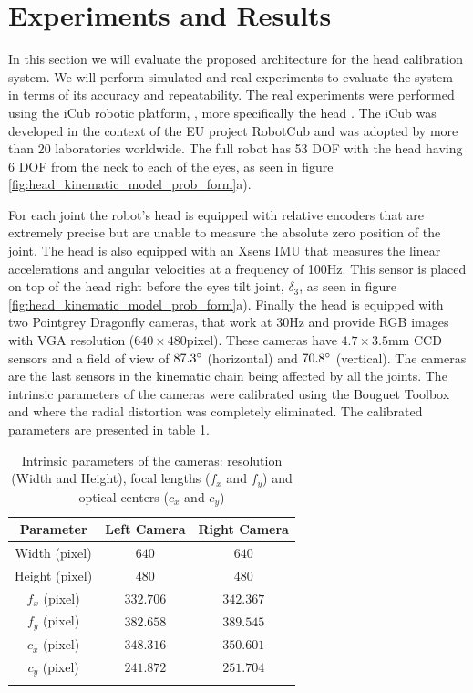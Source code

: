 \section{Experiments and Results}\label{sec:experiments_results}

In this section we will evaluate the proposed architecture for the head calibration system. We will perform simulated and real experiments to evaluate the system in terms of its accuracy and repeatability. The real experiments were performed using the iCub robotic platform, \cite{Metta08}, more specifically the head \cite{Beira06}. The iCub was developed in the context of the EU project RobotCub and was adopted by more than 20 laboratories worldwide. The full robot has 53 DOF with the head having 6 DOF from the neck to each of the eyes, as seen in figure \ref{fig:head_kinematic_model_prob_form}a).

For each joint the robot's head is equipped with relative encoders that are extremely precise but are unable to measure the absolute zero position of the joint. The head is also equipped with an Xsens IMU that measures the linear accelerations and angular velocities at a frequency of 100Hz. This sensor is placed on top of the head right before the eyes tilt joint, $\delta_3$, as seen in figure \ref{fig:head_kinematic_model_prob_form}a). Finally the head is equipped with two Pointgrey Dragonfly cameras, that work at 30Hz and provide RGB images with VGA resolution ($640\times480$pixel). These cameras have $4.7\times3.5$mm CCD sensors and a field of view of $87.3\degree$ (horizontal) and $70.8\degree$ (vertical). The cameras are the last sensors in the kinematic chain being affected by all the joints. The intrinsic parameters of the cameras were calibrated using the Bouguet Toolbox \cite{Bouguet08} and where the radial distortion was completely eliminated. The calibrated parameters are presented in table \ref{tab:intrinsic_parameters}.

\begin{table}
\centering
\begin{tabular}{ccc}
 \hline
 Parameter & Left Camera & Right Camera \\
 \hline
 Width (pixel) & $640$ & $640$\\
 Height (pixel) & $480$ & $480$ \\
 $f_x$ (pixel) & $332.706$ & $342.367$\\
 $f_y$ (pixel) & $382.658$ & $389.545$\\
 $c_x$ (pixel) & $348.316$ & $350.601$\\
 $c_y$ (pixel) & $241.872$ & $251.704$\\
 \hline\\
\end{tabular}
\caption{Intrinsic parameters of the cameras: resolution (Width and Height), focal lengths ($f_x$ and $f_y$) and optical centers ($c_x$ and $c_y$)}
\label{tab:intrinsic_parameters}
\end{table}

